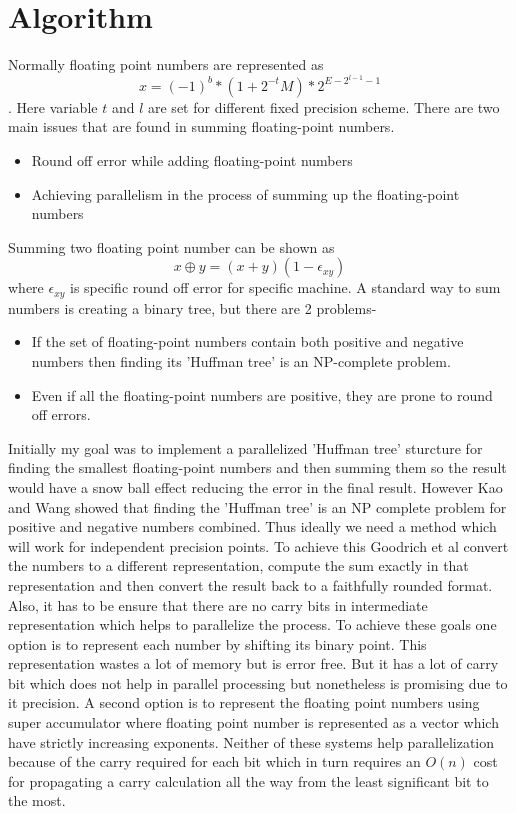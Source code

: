 \documentclass[11pt]{article}       %
\begin{document}
\section{Algorithm} \label{algo}

Normally floating point numbers are represented as $$x=(-1)^{b} * (1+2^{-t}M)*2^{E-2^{l-1}-1}$$. Here variable $t$ and $l$ are set for different fixed precision scheme. There are two main issues that are found in summing floating-point numbers.

\begin{itemize}
	\item Round off error while adding floating-point numbers
	\item Achieving parallelism in the process of summing up the floating-point numbers
\end{itemize}

Summing two floating point number can be shown as $$x \oplus y = (x+y)(1- \epsilon_{xy})$$ where $\epsilon_{xy}$ is specific round off error for specific machine.
A standard way to sum numbers is creating a binary tree, but there are 2 problems-

\begin{itemize}
	\item If the set of floating-point numbers contain both positive and negative numbers then finding its 'Huffman tree' is an NP-complete problem. \cite{LTALCNS}
	\item Even if all the floating-point numbers are positive, they are prone to round off errors.
\end{itemize}

Initially my goal was to implement a parallelized 'Huffman tree' sturcture for finding the smallest floating-point numbers and then summing them so the result would have a snow ball effect reducing the error in the final result. However Kao and Wang \cite{LTALCNS} showed that finding the 'Huffman tree' is an NP complete problem for positive and negative numbers combined. Thus ideally we need a method which will work for independent precision points. To achieve this Goodrich et al \cite{PASFPN} convert the numbers to a different representation, compute the sum exactly in that representation and then convert the result back to a faithfully rounded format. Also, it has to be ensure that there are no carry bits in intermediate representation which helps to parallelize the process. To achieve these goals one option is to represent each number by shifting its binary point. This representation wastes a lot of memory but is error free. But it has a lot of carry bit which does not help in parallel processing but nonetheless is promising due to it precision. A second option is to represent the floating point numbers using super accumulator where floating point number is represented as a vector which have strictly increasing exponents. Neither of these systems help parallelization because of the carry required for each bit which in turn requires an $O(n)$ cost for propagating a carry calculation all the way from the least significant bit to the most.
\end{document}
